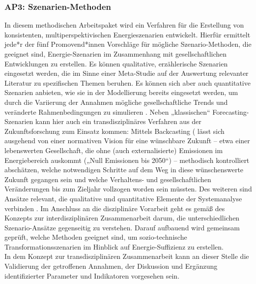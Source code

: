 \documentclass[a4paper,11pt,twoside]{scrartcl}
\begin{document}
\subsubsection*{AP3: Szenarien-Methoden}
In diesem methodischen Arbeitspaket wird ein Verfahren für die Erstellung von konsistenten, multiperspektivischen Energieszenarien entwickelt. Hierfür ermittelt jede*r der fünf Promovend*innen Vorschläge für mögliche Szenario-Methoden, die geeignet sind, Energie-Szenarien im Zusammenhang mit gesellschaftlichen Entwicklungen zu erstellen. %
Es können qualitative, erzählerische Szenarien eingesetzt werden, die im Sinne einer Meta-Studie auf der Auswertung relevanter Literatur zu spezifischen Themen beruhen. Es können sich aber auch quantitative Szenarien anbieten, wie sie in der Modellierung bereits eingesetzt werden, um durch die Variierung der Annahmen mögliche gesellschaftliche Trends und veränderte Rahmenbedingungen zu simulieren \cite{Bierwirth2016}. Neben „klassischen“ Forecasting-Szenarien \cite{Kosow2008} kann hier auch ein transdisziplinäres Verfahren aus der Zukunftsforschung zum Einsatz kommen: Mittels Backcasting (\cite{Robinson 2003, Robinson2011} lässt sich ausgehend von einer normativen Vision für eine wünschbare Zukunft – etwa einer lebenswerten Gesellschaft, die ohne (auch externalisierte) Emissionen im Energiebereich auskommt („Null Emissionen bis 2050“) – methodisch kontrolliert abschätzen, welche notwendigen Schritte auf dem Weg in diese wünschenswerte Zukunft gegangen sein und welche Verhaltens- und gesellschaftlichen Veränderungen bis zum Zieljahr vollzogen worden sein müssten. Des weiteren sind Ansätze relevant, die qualitative und quantitative Elemente der Systemanalyse verbinden \cite{WEIMERJEHLE2016}.
Im Anschluss an die disziplinäre Vorarbeit geht es gemäß des Konzepts zur interdisziplinären Zusammenarbeit darum, die unterschiedlichen Szenario-Ansätze gegenseitig zu verstehen.
Darauf aufbauend wird gemeinsam geprüft, welche Methoden geeignet sind, um sozio-technische Transformationsszenarien im Hinblick auf Energie-Suffizienz zu erstellen.\\
In dem Konzept zur transdisziplinären Zusammenarbeit kann an dieser Stelle die Validierung der getroffenen Annahmen, der Diskussion und Ergänzung identifizierter Parameter und Indikatoren vorgesehen sein.
\end{document}
